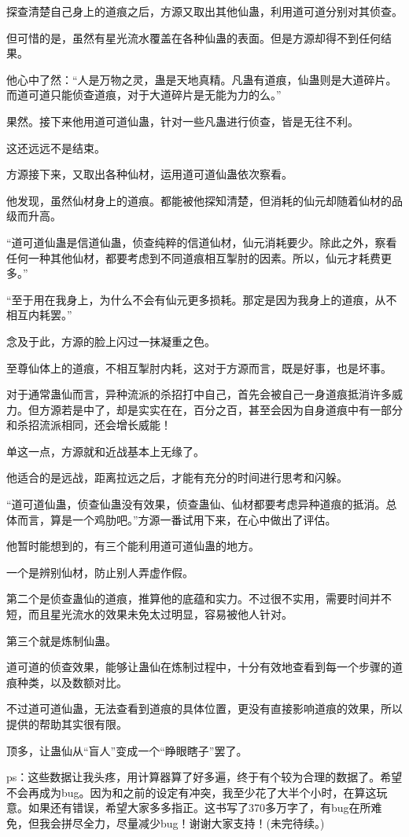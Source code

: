 \begin{this_body}
探查清楚自己身上的道痕之后，方源又取出其他仙蛊，利用道可道分别对其侦查。

但可惜的是，虽然有星光流水覆盖在各种仙蛊的表面。但是方源却得不到任何结果。

他心中了然：“人是万物之灵，蛊是天地真精。凡蛊有道痕，仙蛊则是大道碎片。而道可道只能侦查道痕，对于大道碎片是无能为力的么。”

果然。接下来他用道可道仙蛊，针对一些凡蛊进行侦查，皆是无往不利。

这还远远不是结束。

方源接下来，又取出各种仙材，运用道可道仙蛊依次察看。

他发现，虽然仙材身上的道痕。都能被他探知清楚，但消耗的仙元却随着仙材的品级而升高。

“道可道仙蛊是信道仙蛊，侦查纯粹的信道仙材，仙元消耗要少。除此之外，察看任何一种其他仙材，都要考虑到不同道痕相互掣肘的因素。所以，仙元才耗费更多。”

“至于用在我身上，为什么不会有仙元更多损耗。那定是因为我身上的道痕，从不相互内耗罢。”

念及于此，方源的脸上闪过一抹凝重之色。

至尊仙体上的道痕，不相互掣肘内耗，这对于方源而言，既是好事，也是坏事。

对于通常蛊仙而言，异种流派的杀招打中自己，首先会被自己一身道痕抵消许多威力。但方源若是中了，却是实实在在，百分之百，甚至会因为自身道痕中有一部分和杀招流派相同，还会增长威能！

单这一点，方源就和近战基本上无缘了。

他适合的是远战，距离拉远之后，才能有充分的时间进行思考和闪躲。

“道可道仙蛊，侦查仙蛊没有效果，侦查蛊仙、仙材都要考虑异种道痕的抵消。总体而言，算是一个鸡肋吧。”方源一番试用下来，在心中做出了评估。

他暂时能想到的，有三个能利用道可道仙蛊的地方。

一个是辨别仙材，防止别人弄虚作假。

第二个是侦查蛊仙的道痕，推算他的底蕴和实力。不过很不实用，需要时间并不短，而且星光流水的效果未免太过明显，容易被他人针对。

第三个就是炼制仙蛊。

道可道的侦查效果，能够让蛊仙在炼制过程中，十分有效地查看到每一个步骤的道痕种类，以及数额对比。

不过道可道仙蛊，无法查看到道痕的具体位置，更没有直接影响道痕的效果，所以提供的帮助其实很有限。

顶多，让蛊仙从“盲人”变成一个“睁眼瞎子”罢了。

ps：这些数据让我头疼，用计算器算了好多遍，终于有个较为合理的数据了。希望不会再成为bug。因为和之前的设定有冲突，我至少花了大半个小时，在算这玩意。如果还有错误，希望大家多多指正。这书写了370多万字了，有bug在所难免，但我会拼尽全力，尽量减少bug！谢谢大家支持！(未完待续。)

\end{this_body}

